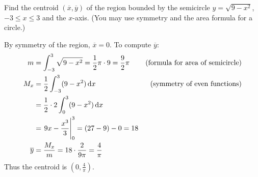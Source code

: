 \documentclass[12pt,answers]{exam}
\begin{document}
\begin{questions}
\question[10]
Find the centroid $(\overline x, \overline y)$ of the region bounded by the semicircle $y = \sqrt{9-x^2}$, $-3 \le x \le 3$ and the $x$-axis.
(You may use symmetry and the area formula for a circle.)
\begin{solution}
    By symmetry of the region, $\overline x = 0$.
    To compute $\overline y$:
    \begin{align*}
        m &= \int_{-3}^3 \sqrt{9-x^2} 
        = \frac12 \pi \cdot 9 
        = \frac92 \pi & (\text{formula for area of semicircle}) \\ 
        M_x &= \frac12 \int_{-3}^3 (9-x^2) \dif x & (\text{symmetry of even functions})\\
        &= \frac 12 \cdot 2 \int_0^3 (9-x^2) \dif x \\
        &= \eval{9x - \frac{x^3}{3}}_0^3 
        = (27 - 9) - 0 
        = 18
        \\ 
        \overline y &= \frac{M_x}{m} = 18 \cdot \frac{2}{9\pi} = \frac{4}{\pi}
    \end{align*}
    Thus the centroid is $\boxed{(0, \tfrac4\pi)}$.
\end{solution}
\end{questions}
\end{document}
